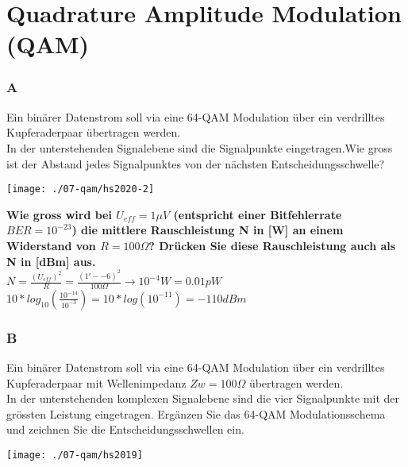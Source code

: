 

\section{Quadrature Amplitude Modulation (QAM)}

\subsubsection{A}
Ein binärer Datenstrom soll via eine 64-QAM Modulation über ein verdrilltes Kupferaderpaar übertragen werden.\\
In der unterstehenden Signalebene sind die Signalpunkte eingetragen.Wie gross ist der Abstand jedes Signalpunktes von der nächsten Entscheidungsschwelle?\\
\begin{center}
    \vspace{-8pt}
    \texttt{[image: ./07-qam/hs2020-2]}
    \vspace{-8pt}
\end{center}

\textbf{Wie gross wird bei $U_{eff}=1\mu V$ (entspricht einer Bitfehlerrate $BER = 10^{-23}$) die mittlere Rauschleistung N in [W] an einem Widerstand von $R=100\Omega$? 
Drücken Sie diese Rauschleistung auch als N in [dBm] aus.}\\
$N=\frac{(U_{eff})^2}{R}=\frac{(1'-{-6})^2}{100\Omega} \rightarrow 10^{-4}W=0.01pW$\\
$10*log_{10}(\frac{10^{-14}}{10^{-3}})=10*log(10^{-11})=-110dBm$

\subsubsection{B}
Ein binärer Datenstrom soll via eine 64-QAM Modulation über ein verdrilltes Kupferaderpaar mit Wellenimpedanz $Zw = 100 \Omega $  übertragen werden.\\
In der unterstehenden komplexen Signalebene sind die vier Signalpunkte mit der grössten Leistung eingetragen. Ergänzen Sie das 64-QAM Modulationsschema und zeichnen Sie
die Entscheidungsschwellen ein.\\
\begin{center}
    \vspace{-8pt}
    \texttt{[image: ./07-qam/hs2019]}
    \vspace{-8pt}
\end{center}


